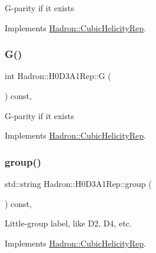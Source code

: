 G-\/parity if it exists 

Implements \mbox{\hyperlink{structHadron_1_1CubicHelicityRep_a50689f42be1e6170aa8cf6ad0597018b}{Hadron\+::\+Cubic\+Helicity\+Rep}}.

\mbox{\label{structHadron_1_1H0D3A1Rep_a654d6957eca34719885b77918fb3ea4d}} 
\subsubsection{\texorpdfstring{G()}{G()}\hspace{0.1cm}{\footnotesize\ttfamily [2/2]}}
{\footnotesize\ttfamily int Hadron\+::\+H0\+D3\+A1\+Rep\+::G (\begin{DoxyParamCaption}{ }\end{DoxyParamCaption}) const\hspace{0.3cm}{\ttfamily [inline]}, {\ttfamily [virtual]}}

G-\/parity if it exists 

Implements \mbox{\hyperlink{structHadron_1_1CubicHelicityRep_a50689f42be1e6170aa8cf6ad0597018b}{Hadron\+::\+Cubic\+Helicity\+Rep}}.

\mbox{\label{structHadron_1_1H0D3A1Rep_acb3ae7caf69d50372d06639f12c8c72c}} 
\subsubsection{\texorpdfstring{group()}{group()}\hspace{0.1cm}{\footnotesize\ttfamily [1/3]}}
{\footnotesize\ttfamily std\+::string Hadron\+::\+H0\+D3\+A1\+Rep\+::group (\begin{DoxyParamCaption}{ }\end{DoxyParamCaption}) const\hspace{0.3cm}{\ttfamily [inline]}, {\ttfamily [virtual]}}

Little-\/group label, like D2, D4, etc. 

Implements \mbox{\hyperlink{structHadron_1_1CubicHelicityRep_a101a7d76cd8ccdad0f272db44b766113}{Hadron\+::\+Cubic\+Helicity\+Rep}}.

\mbox{\label{structHadron_1_1H0D3A1Rep_acb3ae7caf69d50372d06639f12c8c72c}} 
